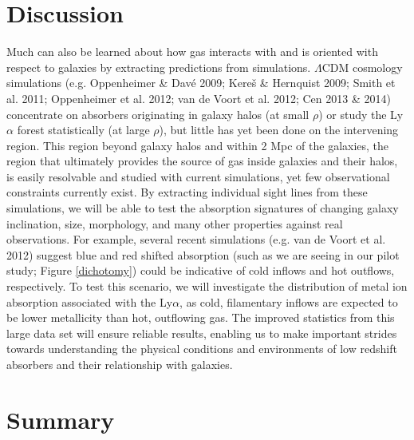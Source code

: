 \documentclass[iop]{emulateapj-rtx4}
\begin{document}
\section{Discussion}
\indent Much can also be learned about how gas interacts with and is oriented with respect to galaxies by extracting predictions from simulations. $\Lambda$CDM cosmology simulations (e.g. Oppenheimer \& Dav{\'e} 2009; Kere{\v s} \& Hernquist 2009; Smith et al. 2011; Oppenheimer et al. 2012; van de Voort et al. 2012; Cen 2013 \& 2014) concentrate on absorbers originating in galaxy halos (at small $\rho$) or study the Ly$\alpha$ forest statistically (at large $\rho$), but little has yet been done on the intervening region. This region beyond galaxy halos and within 2 Mpc of the galaxies, the region that ultimately provides the source of gas inside galaxies and their halos, is easily resolvable and studied with current simulations, yet few observational constraints currently exist. By extracting individual sight lines from these simulations, we will be able to test the absorption signatures of changing galaxy inclination, size, morphology, and many other properties against real observations. For example, several recent simulations (e.g. van de Voort et al. 2012) suggest blue and red shifted absorption (such as we are seeing in our pilot study; Figure \ref{dichotomy}) could be indicative of cold inflows and hot outflows, respectively. To test this scenario, we will investigate the distribution of metal ion absorption associated with the Ly$\alpha$, as cold, filamentary inflows are expected to be lower metallicity than hot, outflowing gas. The improved statistics from this large data set will ensure reliable results, enabling us to make important strides towards understanding the physical conditions and environments of low redshift absorbers and their relationship with galaxies.



\vspace{10pt}
\section{Summary}
\end{document}
